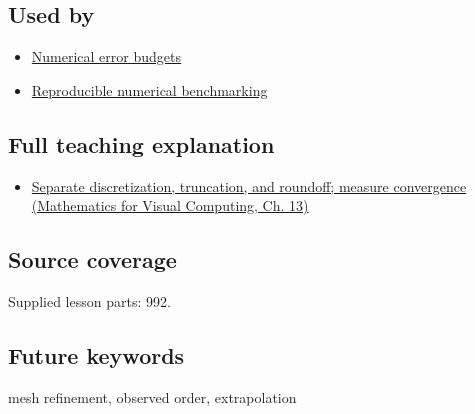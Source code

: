 \subsection{Used by}\label{appendix-aca80b6bf17a-used-by}

\hypertarget{appendix-aca80b6bf17a-used-by}{}

\begin{itemize}
\tightlist
\item
  \hyperref[appendix-31b8c295e05f]{Numerical error budgets}
\item
  \hyperref[appendix-b9db93e28371]{Reproducible numerical benchmarking}
\end{itemize}

\subsection{Full teaching explanation}\label{appendix-aca80b6bf17a-full-teaching-explanation}

\hypertarget{appendix-aca80b6bf17a-full-teaching-explanation}{}

\begin{itemize}
\tightlist
\item
  \href{../02-Mathematics-for-Visual-Computing/main.pdf\#nameddest=02-foundations-ii-ch029-separate-discretization-truncation-and-roundoff-measure-convergence}{Separate discretization, truncation, and roundoff; measure convergence (Mathematics for Visual Computing, Ch. 13)}
\end{itemize}

\subsection{Source coverage}\label{appendix-aca80b6bf17a-source-coverage}

\hypertarget{appendix-aca80b6bf17a-source-coverage}{}

Supplied lesson parts: 992.

\subsection{Future keywords}\label{appendix-aca80b6bf17a-future-keywords}

\hypertarget{appendix-aca80b6bf17a-future-keywords}{}

mesh refinement, observed order, extrapolation

